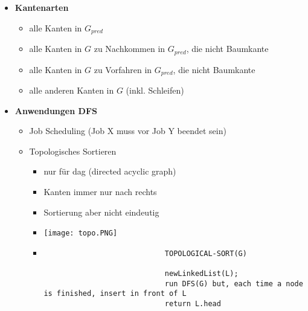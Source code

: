 \begin{itemize}
        \item \textbf{Kantenarten}
            \begin{itemize}
                \item {} alle Kanten in $G_{pred}$
                \item {} alle Kanten in $G$ zu Nachkommen in $G_{pred}$, die nicht Baumkante
                \item {} alle Kanten in $G$ zu Vorfahren in $G_{pred}$, die nicht Baumkante
                \item {} alle anderen Kanten in $G$ (inkl. Schleifen)
            \end{itemize}

        \item \textbf{Anwendungen DFS}
            \begin{itemize}
                \item Job Scheduling (Job X muss vor Job Y beendet sein)
                \item Topologisches Sortieren
                    \begin{itemize}
                        \item nur für dag (directed acyclic graph)
                        \item Kanten immer nur nach rechts
                        \item Sortierung aber nicht eindeutig
                        \item[] \texttt{[image: topo.PNG]}
                        \item[]
                            \begin{verbatim}
                            TOPOLOGICAL-SORT(G)

                            newLinkedList(L);
                            run DFS(G) but, each time a node is finished, insert in front of L
                            return L.head
                            \end{verbatim} 
                    \end{itemize}
            \end{itemize}
        

\end{itemize}
